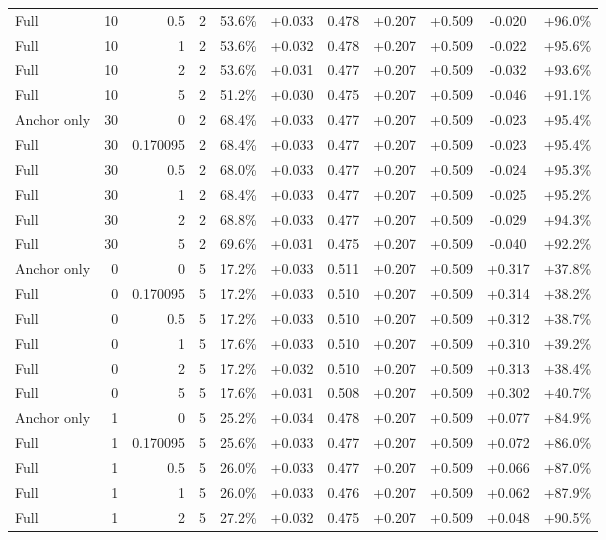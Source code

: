 \begin{table}[htbp]
\begin{tabular}{lrrrccccccc}
Full & 10 & 0.5 & 2 & 53.6\% & +0.033 & 0.478 & +0.207 & +0.509 & -0.020 & +96.0\% \\
Full & 10 & 1 & 2 & 53.6\% & +0.032 & 0.478 & +0.207 & +0.509 & -0.022 & +95.6\% \\
Full & 10 & 2 & 2 & 53.6\% & +0.031 & 0.477 & +0.207 & +0.509 & -0.032 & +93.6\% \\
Full & 10 & 5 & 2 & 51.2\% & +0.030 & 0.475 & +0.207 & +0.509 & -0.046 & +91.1\% \\
Anchor only & 30 & 0 & 2 & 68.4\% & +0.033 & 0.477 & +0.207 & +0.509 & -0.023 & +95.4\% \\
Full & 30 & 0.170095 & 2 & 68.4\% & +0.033 & 0.477 & +0.207 & +0.509 & -0.023 & +95.4\% \\
Full & 30 & 0.5 & 2 & 68.0\% & +0.033 & 0.477 & +0.207 & +0.509 & -0.024 & +95.3\% \\
Full & 30 & 1 & 2 & 68.4\% & +0.033 & 0.477 & +0.207 & +0.509 & -0.025 & +95.2\% \\
Full & 30 & 2 & 2 & 68.8\% & +0.033 & 0.477 & +0.207 & +0.509 & -0.029 & +94.3\% \\
Full & 30 & 5 & 2 & 69.6\% & +0.031 & 0.475 & +0.207 & +0.509 & -0.040 & +92.2\% \\
Anchor only & 0 & 0 & 5 & 17.2\% & +0.033 & 0.511 & +0.207 & +0.509 & +0.317 & +37.8\% \\
Full & 0 & 0.170095 & 5 & 17.2\% & +0.033 & 0.510 & +0.207 & +0.509 & +0.314 & +38.2\% \\
Full & 0 & 0.5 & 5 & 17.2\% & +0.033 & 0.510 & +0.207 & +0.509 & +0.312 & +38.7\% \\
Full & 0 & 1 & 5 & 17.6\% & +0.033 & 0.510 & +0.207 & +0.509 & +0.310 & +39.2\% \\
Full & 0 & 2 & 5 & 17.2\% & +0.032 & 0.510 & +0.207 & +0.509 & +0.313 & +38.4\% \\
Full & 0 & 5 & 5 & 17.6\% & +0.031 & 0.508 & +0.207 & +0.509 & +0.302 & +40.7\% \\
Anchor only & 1 & 0 & 5 & 25.2\% & +0.034 & 0.478 & +0.207 & +0.509 & +0.077 & +84.9\% \\
Full & 1 & 0.170095 & 5 & 25.6\% & +0.033 & 0.477 & +0.207 & +0.509 & +0.072 & +86.0\% \\
Full & 1 & 0.5 & 5 & 26.0\% & +0.033 & 0.477 & +0.207 & +0.509 & +0.066 & +87.0\% \\
Full & 1 & 1 & 5 & 26.0\% & +0.033 & 0.476 & +0.207 & +0.509 & +0.062 & +87.9\% \\
Full & 1 & 2 & 5 & 27.2\% & +0.032 & 0.475 & +0.207 & +0.509 & +0.048 & +90.5\% \\

\end{tabular}
\end{table}
